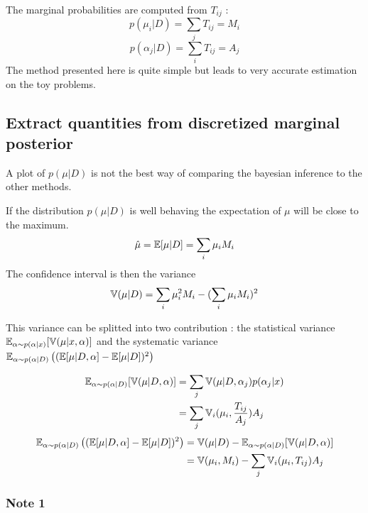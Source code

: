 The marginal probabilities are computed from $T_{ij}$ :
\begin{equation}
	p(\mu_i | D) = \sum_j T_{ij} = M_i
\end{equation}
\begin{equation}
  p(\alpha_j | D) = \sum_i T_{ij} = A_j
\end{equation}
The method presented here is quite simple but leads to very accurate estimation on the toy problems.


\subsection{Extract quantities from discretized marginal posterior} %
\label{sub:extract_quantities_from_discretized_marginal_posterior}

A plot of $p(\mu | D)$ is not the best way of comparing the bayesian inference to the other methods.

If the distribution $p(\mu | D)$ is well behaving the expectation of $\mu$ will be close to the maximum.
\begin{equation}
	\hat\mu = \mathbb{E}[\mu|D] = \sum_i \mu_i M_i
\end{equation}
The confidence interval is then the variance
\begin{equation}
	\mathbb{V}(\mu|D) = \sum_i \mu_i^2 M_i - (\sum_i \mu_i M_i)^2
\end{equation}

This variance can be splitted into two contribution : the statistical variance $\mathbb{E}_{\alpha \sim p(\alpha|x)}[ \mathbb{V}(\mu|x, \alpha) ]$ and the systematic variance $\mathbb{E}_{\alpha \sim p(\alpha|D)} \left ((\mathbb{E} [\mu|D, \alpha]  - \mathbb{E}[\mu|D])^2\right )$

\begin{align}
	\mathbb{E}_{\alpha \sim p(\alpha|D)}[ \mathbb{V}(\mu|D, \alpha) ] 
			&= \sum_j \mathbb{V}(\mu|D, \alpha_j) p(\alpha_j | x) \\
			&= \sum_j \mathbb{V}_i(\mu_i, \frac{T_{ij}}{A_j}) A_j
\end{align}
\begin{align}
	\mathbb{E}_{\alpha \sim p(\alpha|D)} \left ((\mathbb{E} [\mu|D, \alpha]  - \mathbb{E}[\mu|D])^2\right ) 
			&= \mathbb{V}(\mu|D) - \mathbb{E}_{\alpha \sim p(\alpha|D)}[ \mathbb{V}(\mu|D, \alpha) ] \\
			&= \mathbb{V}(\mu_i, M_i) - \sum_j \mathbb{V}_i(\mu_i, T_{ij}) A_j
\end{align}

\subsubsection{Note 1}

